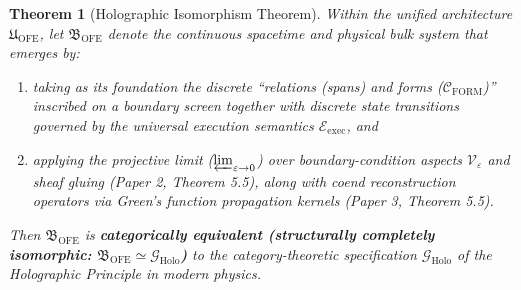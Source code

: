 \documentclass[11pt,a4paper]{article}
\theoremstyle{definition}
\theoremstyle{plain}
\newtheorem{theorem}{Theorem}[section]
\begin{document}
\begin{theorem}[Holographic Isomorphism Theorem]
Within the unified architecture $\mathfrak{U}_{\mathrm{OFE}}$, let $\mathfrak{B}_{\mathrm{OFE}}$ denote the continuous spacetime and physical bulk system that emerges by:
\begin{enumerate}
    \item taking as its foundation the discrete ``relations (spans) and forms ($\mathcal{C}_{\mathrm{FORM}}$)'' inscribed on a boundary screen together with discrete state transitions governed by the universal execution semantics $\mathcal{E}_{\mathrm{exec}}$, and
    \item applying the projective limit ($\varprojlim_{\varepsilon \to 0}$) over boundary-condition aspects $\mathcal{V}_{\varepsilon}$ and sheaf gluing (Paper 2, Theorem 5.5), along with coend reconstruction operators via Green's function propagation kernels (Paper 3, Theorem 5.5).
\end{enumerate}
Then $\mathfrak{B}_{\mathrm{OFE}}$ is \textbf{categorically equivalent (structurally completely isomorphic: $\mathfrak{B}_{\mathrm{OFE}} \simeq \mathcal{G}_{\mathrm{Holo}}$)} to the category-theoretic specification $\mathcal{G}_{\mathrm{Holo}}$ of the Holographic Principle in modern physics.
\end{theorem}
\end{document}
